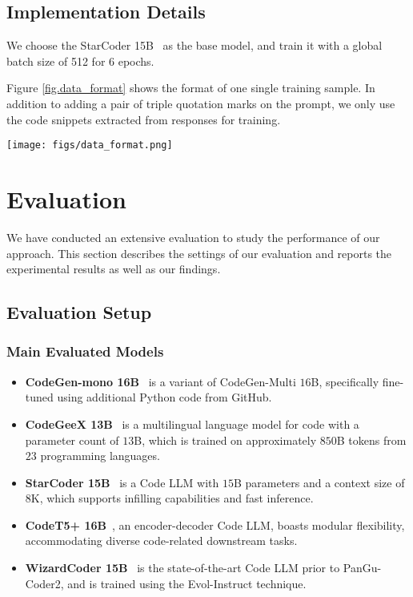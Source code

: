 \documentclass{article}
\newcommand{\pgcoder}{PanGu-Coder2\xspace}
\begin{document}
\subsection{Implementation Details}

We choose the StarCoder 15B~\cite{starcoder} as the base model, and train it with a global batch size of 512 for 6 epochs. 

Figure \ref{fig.data_format} shows the format of one single training sample. In addition to adding a pair of triple quotation marks on the prompt, we only use the code snippets extracted from responses for training.

\begin{figure*}[h]
  \centering
  \texttt{[image: figs/data\_format.png]}
  \caption{Example data format of the training sample.}
\label{fig.data_format}
\end{figure*}


\section{Evaluation}
\label{sec.exp}
We have conducted an extensive evaluation to study the performance of our approach. This section describes the settings of our evaluation and reports the experimental results as well as our findings.



\subsection{Evaluation Setup}

\subsubsection{Main Evaluated Models}

\begin{itemize}
    \item \textbf{CodeGen-mono 16B}~\cite{codegen} is a variant of CodeGen-Multi $16$B, specifically fine-tuned using additional Python code from GitHub.
    \item \textbf{CodeGeeX 13B}~\cite{codegeex} is a multilingual language model for code with a parameter count of $13$B, which is trained on approximately $850$B tokens from $23$ programming languages.
    \item \textbf{StarCoder 15B}~\cite{starcoder} is a Code LLM with $15$B parameters and a context size of $8$K, which supports infilling capabilities and fast inference.
    \item \textbf{CodeT5+ 16B}~\cite{codet5plus}, an encoder-decoder Code LLM, boasts modular flexibility, accommodating diverse code-related downstream tasks.
    \item \textbf{WizardCoder 15B}~\cite{wizardcoder} is the state-of-the-art Code LLM prior to \pgcoder, and is trained using the Evol-Instruct technique.
\end{itemize}
\end{document}
